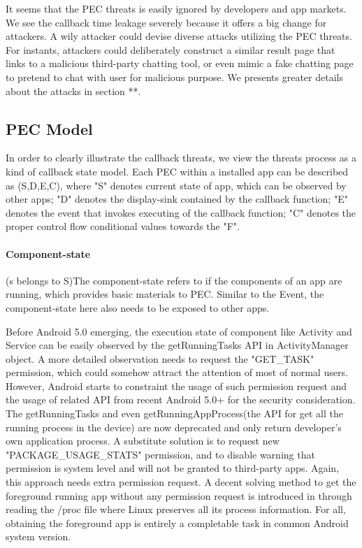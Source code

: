 \documentclass{sig-alternate-05-2015}
\begin{document}
It seems that the PEC threats is easily ignored by developers and app markets. We see the callback time leakage severely because it offers a big change for attackers. A wily attacker could devise diverse attacks utilizing the PEC threats. For instants, attackers could deliberately construct a similar result page that links to a malicious third-party chatting tool, or even mimic a fake chatting page to pretend to chat with user for malicious purpose. We presents greater details about the attacks in section **.

\subsection{PEC Model} 

In order to clearly illustrate the callback threats, we view the threats process as a kind of callback state model. Each PEC within a installed app can be described as (S,D,E,C), where "S" denotes current state of app, which can be observed by other apps; "D" denotes the display-sink contained by the callback function; "E" denotes the event that invokes executing of the callback function; "C" denotes the proper control flow conditional values towards the "F".

\paragraph{Component-state}

(s belongs to S)The component-state refers to if the components of an app are running, which provides basic materials to PEC. Similar to the Event, the component-state here also needs to be exposed to other apps.

Before {\color{red}Android 5.0} emerging, the execution state of component like Activity and Service can be easily observed by the {\color{red}getRunningTasks API in ActivityManager object}. A more detailed observation needs to request the "GET\_TASK" permission, which could somehow attract the attention of most of normal users. However, Android starts to constraint the usage of such permission request and the usage of related API from recent {\color{red}Android 5.0+} for the security consideration. The getRunningTasks and even getRunningAppProcess(the API for get all the running process in the device) are now deprecated and only return developer's own application process. {\color{red}A substitute solution is to request new "PACKAGE\_USAGE\_STATS" permission, and to disable warning that permission is system level and will not be granted to third-party apps. Again, this approach needs extra permission request. } A decent solving method to get the foreground running app without any permission request is introduced in  \cite{getforeground} through reading the /proc file where Linux preserves all its process information. For all, obtaining the foreground app is entirely a completable task in common Android system version. 
\end{document}
